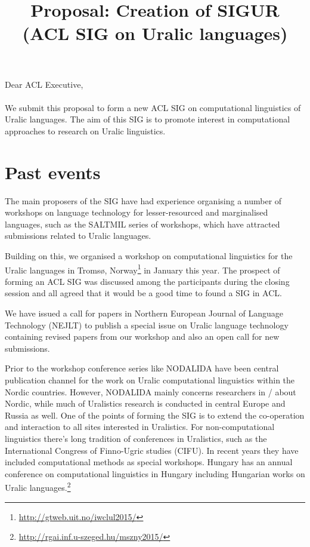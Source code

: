 \documentclass[11pt,a4paper]{article}
\title{Proposal: Creation of SIGUR (ACL SIG on Uralic languages)}
\date{}
\begin{document}
\maketitle

Dear ACL Executive,\\
~\\
We submit this proposal to form a new ACL SIG on
computational linguistics of Uralic languages. The
aim of this SIG is to promote interest in
computational approaches to research on Uralic
linguistics. 

\section*{Past events}

The main proposers of the SIG have had experience organising a number of workshops 
on language technology for lesser-resourced and marginalised languages, such as 
the SALTMIL series of workshops, which have attracted submissions related to 
Uralic languages.

Building on this, we organised a workshop on computational linguistics for the 
Uralic languages in Tromsø,
Norway\footnote{\url{http://gtweb.uit.no/iwclul2015/}}
in January this year. The prospect of forming an ACL
SIG was discussed among the participants during the closing session and all
agreed that it would be a good time to found a SIG
in ACL.

We have issued a call for papers in Northern European Journal of Language 
Technology (NEJLT) to publish a special issue on Uralic language
technology containing revised papers from our workshop and also an open 
call for new submissions.

Prior to the workshop conference series like NODALIDA have been central publication channel for the work on Uralic computational linguistics within the Nordic countries. However, NODALIDA mainly concerns researchers in / about Nordic, while much of Uralistics research is conducted in central Europe and Russia as well. One of the points of forming the SIG is to extend the co-operation and interaction to all sites interested in Uralistics.
For non-computational linguistics there's long tradition of conferences in Uralistics, such as the International Congress of Finno-Ugric studies (CIFU). In recent years they have included computational methods as special workshops.  Hungary has an annual conference on computational linguistics in Hungary including Hungarian works on Uralic languages.\footnote{\url{http://rgai.inf.u-szeged.hu/mszny2015/}}
\end{document}
